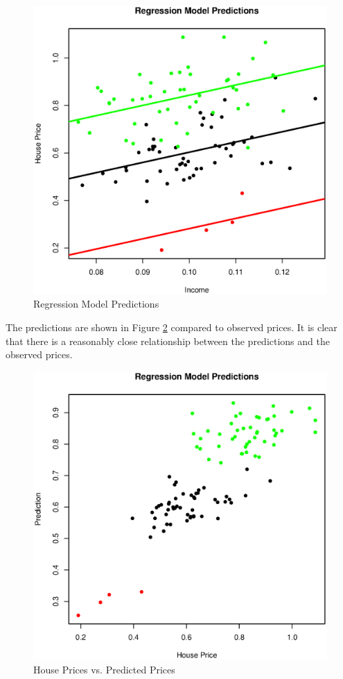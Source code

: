 \documentclass{paper}
\begin{document}
\begin{figure}
\centering
\includegraphics[width=\textwidth]{../Figures/regression.eps}
\caption{Regression Model Predictions}
\label{fig:reg}
\end{figure}


\pagebreak
The predictions are shown in Figure \ref{fig:pred} compared to observed prices. 
It is clear that there is a reasonably close relationship between the predictions and the observed prices. 

\begin{figure}
\centering
\includegraphics[width=\textwidth]{../Figures/predictions.eps}
\caption{House Prices vs. Predicted Prices}
\label{fig:pred}
\end{figure}




\end{document}
